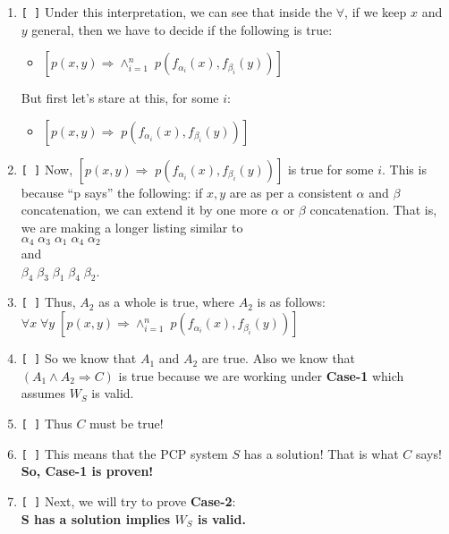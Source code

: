 \documentclass[11pt]{article}
\begin{document}
\begin{Large}
\begin{enumerate}
\item \verb|[ ]| Under this interpretation, we can see that inside
  the $\forall$, if we keep $x$ and $y$ general, then
  we have to decide if the following is true:
  \begin{itemize}
    \item $[p(x,y) \Rightarrow \wedge_{i=1}^{n} \; p(f_{\alpha_i}(x), f_{\beta_i}(y))] $
  \end{itemize}
  But first let's stare at this, for some $i$:
  \begin{itemize}
  \item $[p(x,y) \Rightarrow  \; p(f_{\alpha_i}(x), f_{\beta_i}(y))] $
  \end{itemize}

\item \verb|[ ]|
  Now,   $[p(x,y) \Rightarrow  \; p(f_{\alpha_i}(x), f_{\beta_i}(y))] $ is true for some $i$. This is because ``p says'' the following: if $x,y$
  are as per a consistent $\alpha$ and $\beta$ concatenation,
  we can extend it by one more $\alpha$ or $\beta$ concatenation.
  That is, we are making a longer listing similar to \\
  $\alpha_{4} \;  \alpha_{3}  \; \alpha_{1} \; \alpha_{4} \; \alpha_{2}$\\
  and\\
  $\beta_{4} \; \beta_{3}  \; \beta_{1} \; \beta_{4} \; \beta_{2}$.


\item \verb|[ ]|
  Thus, $A_2$ as a whole is true, where $A_2$ is as follows:\\
$\textstyle \forall x\; \forall y\;
  [p(x,y) \Rightarrow \wedge_{i=1}^{n} \; p(f_{\alpha_i}(x), f_{\beta_i}(y))] \;\;\;\;\;\;\;\; $ 
  

\item \verb|[ ]| So we know that  $A_1$ and $A_2$ are true. Also
  we know that $(A_1\wedge A_2\Rightarrow C)$ is true because
  we are working under {\bf Case-1} which assumes $W_S$ is valid.


\item \verb|[ ]| Thus $C$ must be true!

\item \verb|[ ]| This means that the PCP system $S$ has a solution! That is
  what $C$ says!  {\bf So, Case-1 is proven!}

\item \verb|[ ]|
  Next, we will try to prove  {\bf Case-2}:\\
   {\bf S has a solution implies $W_S$ is valid.}


\end{enumerate}
\end{Large}
\end{document}
